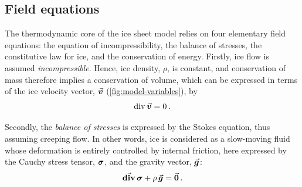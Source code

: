 \documentclass[a4paper]{kappa}
\newcommand{\vect}[1]{\va*{#1}} %
\newcommand{\tens}[1]{\vb*{#1}} %
\renewcommand{\div}[1]{\mathrm{div}\,#1}            %
\newcommand{\tdiv}[1]{\vect{\mathrm{div}}\,#1}      %
\newcommand{\CST}[0]{\tens{\sigma}}     %
\newcommand{\vv}[0]{\vect{v}}           %
\begin{document}
\subsection{Field equations}

The thermodynamic core of the ice sheet model relies on four elementary field
equations: the equation of incompressibility, the balance of stresses, the
constitutive law for ice, and the conservation of energy. Firstly, ice flow is
assumed \emph{incompressible}. Hence, ice density, $\rho$, is constant, and
conservation of mass therefore implies a conservation of volume, which can be
expressed
in terms of the ice velocity vector, $\vv$ (\cref{fig:model-variables}), by
\begin{equation}
    \label{eqn:incompressibility}
    \div{\vv} = 0 \,.
\end{equation}

Secondly, the \emph{balance of stresses} is expressed by the Stokes equation,
thus assuming creeping flow. In other words, ice is considered as a slow-moving
fluid whose deformation is entirely controlled by internal friction, here
expressed by the Cauchy stress tensor, $\CST$, and the gravity vector,
$\vect{g}$:
\begin{equation}
    \label{eqn:stressbalance}
    \tdiv{\CST} + \rho\,\vect{g} = \vect{0} \,.
\end{equation}
\end{document}
